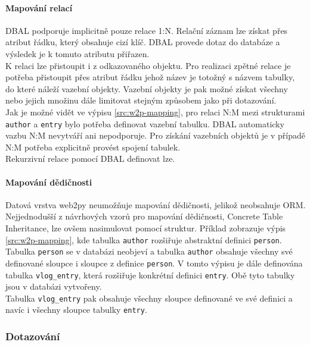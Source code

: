 \documentclass[ing,male,java,dept456]{diploma}						%
\begin{document}
\paragraph{Mapování relací}

DBAL podporuje implicitně pouze relace 1:N. Relační záznam lze získat přes atribut řádku, který obsahuje cizí klíč. DBAL provede dotaz do databáze a výsledek je k tomuto atributu přiřazen. \\
K relaci lze přistoupit i z odkazovaného objektu. Pro realizaci zpětné relace je potřeba přistoupit přes atribut řádku jehož název je totožný s názvem tabulky, do které náleží vazební objekty. Vazební objekty je pak možné získat všechny nebo jejich množinu dále limitovat stejným způsobem jako při dotazování. \\
Jak je možné vidět ve výpisu \ref{src:w2p-mapping}, pro relaci N:M mezi strukturami \lstinline[style=inlinepython]|author| a \lstinline[style=inlinepython]|entry| bylo potřeba definovat vazební tabulku. DBAL automaticky vazbu N:M nevytváří ani nepodporuje. Pro získání vazebních objektů je v případě N:M potřeba explicitně provést spojení tabulek. \\
Rekurzivní relace pomocí DBAL definovat lze. \\

\paragraph{Mapování dědičnosti}
Datová vrstva web2py neumožňuje mapování dědičnosti, jelikož neobsahuje ORM. Nejjednodušší z návrhových vzorů pro mapování dědičnosti, Concrete Table Inheritance, lze ovšem nasimulovat pomocí struktur. Příklad zobrazuje výpis \ref{src:w2p-mapping}, kde tabulka \lstinline[style=inlinepython]|author| rozšiřuje abstraktní definici \lstinline[style=inlinepython]|person|. Tabulka \lstinline[style=inlinepython]|person| se v databázi neobjeví a tabulka \lstinline[style=inlinepython]|author| obsahuje všechny své definované sloupce i sloupce z definice \lstinline[style=inlinepython]|person|. V tomto výpisu je dále definována tabulka \lstinline[style=inlinepython]|vlog_entry|, která rozšiřuje konkrétní definici \lstinline[style=inlinepython]|entry|. Obě tyto tabulky jsou v databázi vytvořeny. \\
Tabulka \lstinline[style=inlinepython]|vlog_entry| pak obsahuje všechny sloupce definované ve své definici a navíc i všechny sloupce tabulky \lstinline[style=inlinepython]|entry|.

\subsubsection{Dotazování}
\end{document}
